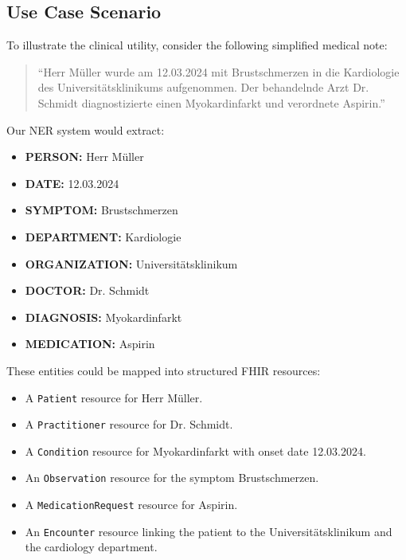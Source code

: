 \documentclass[conference]{IEEEtran}
\begin{document}
\subsection{Use Case Scenario}
To illustrate the clinical utility, consider the following simplified medical note:

\begin{quote}

{\raggedright ``Herr Müller wurde am 12.03.2024 mit Brustschmerzen in die Kardiologie des Universitätsklinikums aufgenommen. Der behandelnde Arzt Dr. Schmidt diagnostizierte einen Myokardinfarkt und verordnete Aspirin.'' \par}
\end{quote}

Our NER system would extract:
\begin{itemize}
    \item \textbf{PERSON:} Herr Müller
    \item \textbf{DATE:} 12.03.2024
    \item \textbf{SYMPTOM:} Brustschmerzen
    \item \textbf{DEPARTMENT:} Kardiologie
    \item \textbf{ORGANIZATION:} Universitätsklinikum
    \item \textbf{DOCTOR:} Dr. Schmidt
    \item \textbf{DIAGNOSIS:} Myokardinfarkt
    \item \textbf{MEDICATION:} Aspirin
\end{itemize}

These entities could be mapped into structured FHIR resources:

\begin{itemize}
    \item A \texttt{Patient} resource for Herr Müller.
    \item A \texttt{Practitioner} resource for Dr. Schmidt.
    \item A \texttt{Condition} resource for Myokardinfarkt with onset date 12.03.2024.
    \item {\raggedright An \texttt{Observation} resource for the symptom Brustschmerzen. \par}
    \item A \texttt{MedicationRequest} resource for Aspirin.
    \item An \texttt{Encounter} resource linking the patient to the Universitätsklinikum and the cardiology department.
\end{itemize}
\end{document}
